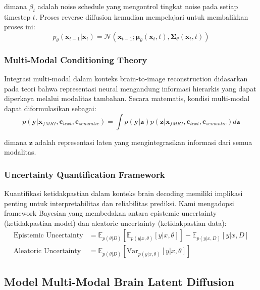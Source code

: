 dimana $\beta_t$ adalah noise schedule yang mengontrol tingkat noise pada setiap timestep $t$. Proses reverse diffusion kemudian mempelajari untuk membalikkan proses ini:
\begin{equation}
p_\theta(\mathbf{x}_{t-1} | \mathbf{x}_t) = \mathcal{N}(\mathbf{x}_{t-1}; \boldsymbol{\mu}_\theta(\mathbf{x}_t, t), \boldsymbol{\Sigma}_\theta(\mathbf{x}_t, t))
\label{eq:reverse_diffusion}
\end{equation}

\subsubsection{Multi-Modal Conditioning Theory}
Integrasi multi-modal dalam konteks brain-to-image reconstruction didasarkan pada teori bahwa representasi neural mengandung informasi hierarkis yang dapat diperkaya melalui modalitas tambahan. Secara matematis, kondisi multi-modal dapat diformulasikan sebagai:
\begin{equation}
p(\mathbf{y} | \mathbf{x}_{fMRI}, \mathbf{c}_{text}, \mathbf{c}_{semantic}) = \int p(\mathbf{y} | \mathbf{z}) p(\mathbf{z} | \mathbf{x}_{fMRI}, \mathbf{c}_{text}, \mathbf{c}_{semantic}) d\mathbf{z}
\label{eq:multimodal_conditioning}
\end{equation}

dimana $\mathbf{z}$ adalah representasi laten yang mengintegrasikan informasi dari semua modalitas.

\subsubsection{Uncertainty Quantification Framework}
Kuantifikasi ketidakpastian dalam konteks brain decoding memiliki implikasi penting untuk interpretabilitas dan reliabilitas prediksi. Kami mengadopsi framework Bayesian yang membedakan antara epistemic uncertainty (ketidakpastian model) dan aleatoric uncertainty (ketidakpastian data):
\begin{align}
\text{Epistemic Uncertainty} &= \mathbb{E}_{p(\theta|D)}[\mathbb{E}_{p(y|x,\theta)}[y|x,\theta]] - \mathbb{E}_{p(y|x,D)}[y|x,D] \label{eq:epistemic_theory} \\
\text{Aleatoric Uncertainty} &= \mathbb{E}_{p(\theta|D)}[\text{Var}_{p(y|x,\theta)}[y|x,\theta]] \label{eq:aleatoric_theory}
\end{align}

\subsection{Model Multi-Modal Brain Latent Diffusion}


